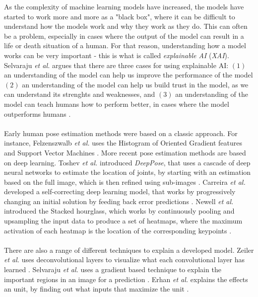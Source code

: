 \documentclass[./main.tex]{subfiles}
\begin{document}
As the complexity of machine learning models have increased, the models have started to work more and more as a "black box", where it can be difficult to understand how the models work and why they work as they do. This can often be a problem, especially in cases where the output of the model can result in a life or death situation of a human. For that reason, understanding how a model works can be very important - this is what is called \textit{explainable AI} (\textit{XAI}). Selvaraju \textit{et al.} \cite{Selvaraju} argues that there are three cases for using explainable AI: $(1)$ an understanding of the model can help us improve the performance of the model $(2)$ an understanding of the model can help us build trust in the model, as we can understand its strenghts and weaknesses, and $(3)$ an understanding of the model can teach humans how to perform better, in cases where the model outperforms humans \cite{Selvaraju}.
\\
\\
Early human pose estimation methods were based on a classic approach. For instance, Felzenszwalb \textit{et al.} uses the Histogram of Oriented Gradient features and Support Vector Machines \cite{Felzenszwalb}. More recent pose estimation methods are based on deep learning. Toshev \textit{et al.} introduced \textit{DeepPose}, that uses a cascade of deep neural networks to estimate the location of joints, by starting with an estimation based on the full image, which is then refined using sub-images \cite{DeepPose}. Carreira \textit{et al.} developed a self-correcting deep learning model, that works by progressively changing an initial solution by feeding back error predictions \cite{Carreira}. Newell \textit{et al.} introduced the Stacked hourglass, which works by continuously pooling and upsampling the input data to produce a set of heatmaps, where the maximum activation of each heatmap is the location of the corresponding keypoints \cite{Newell}.
\\
\\
There are also a range of different techniques to explain a developed model. Zeiler \textit{et al.} uses deconvolutional layers to visualize what each convolutional layer has learned \cite{Zeiler}. Selvaraju \textit{et al.} uses a gradient based technique to explain the important regions in an image for a prediction \cite{Selvaraju}. Erhan \textit{et al.} explains the effects an unit, by finding out what inputs that maximize the unit \cite{Erhan}.
\\
\\
\end{document}
